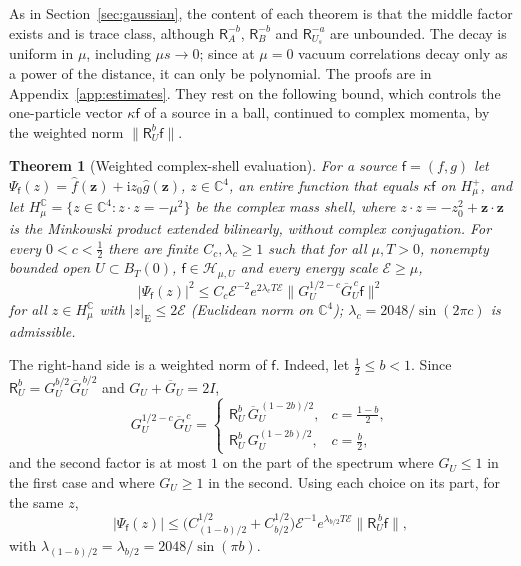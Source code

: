 \documentclass[aps,prl,reprint,longbibliography,raggedbottom]{revtex4-2}
\newtheorem{theorem}{Theorem}
\newcommand{\C}{\mathbb C}
\newcommand{\ii}{\mathrm i}
\newcommand{\norm}[1]{\lVert #1\rVert}
\newcommand{\abs}[1]{\lvert #1\rvert}
\newcommand{\Hh}{\mathcal H}
\newcommand{\Res}{\mathsf R}
\newcommand{\JointRes}{\Res_{U_s}}
\newcommand{\sx}{\mathsf f}
\newcommand{\bz}{\mathbf z}
\newcommand{\Energy}{\mathcal E}
\begin{document}
As in Section~\ref{sec:gaussian}, the content of each theorem is
that the middle factor exists and is trace class, although
$\Res_A^{-b}$, $\Res_B^{-b}$ and $\JointRes^{-a}$ are unbounded. The
decay is uniform in $\mu$, including $\mu s\to0$; since at $\mu=0$
vacuum correlations decay only as a power of the distance, it can only
be polynomial. The proofs are in Appendix~\ref{app:estimates}. They
rest on the following bound, which controls the one-particle vector
$\kappa\sx$ of a source in a ball, continued to complex momenta, by
the weighted norm $\norm{\Res_U^b\sx}$.

\begin{theorem}[Weighted complex-shell evaluation]\label{thm:evaluation}
For a source $\sx=(f,g)$ let $\Psi_\sx(z)=\hat f(\bz)+\ii z_0\hat g(\bz)$,
$z\in\C^4$, an entire function that equals $\kappa\sx$ on $H_\mu^+$,
and let $H_\mu^{\C}=\{z\in\C^4:z\cdot z=-\mu^2\}$ be the complex
mass shell, where $z\cdot z=-z_0^2+\bz\cdot\bz$ is the Minkowski product
extended bilinearly, without complex conjugation. For every $0<c<\frac12$ there are finite $C_c,\lambda_c\ge1$
such that for all $\mu,T>0$, nonempty bounded open $U\subset B_T(0)$,
$\sx\in\Hh_{\mu,U}$ and every energy scale $\Energy\ge\mu$,
\begin{equation}
\abs{\Psi_\sx(z)}^2\le C_c\Energy^{-2}e^{2\lambda_cT\Energy}
\norm{G_U^{1/2-c}\overline G_U^{\,c}\sx}^2
\label{eq:evaluation}
\end{equation}
for all $z\in H_\mu^{\C}$ with $\abs z_{\mathrm E}\le2\Energy$
(Euclidean norm on $\C^4$); $\lambda_c=2048/\sin(2\pi c)$ is admissible.
\end{theorem}

The right-hand side is a weighted norm of $\sx$. Indeed, let
$\frac12\le b<1$. Since $\Res_U^b=G_U^{b/2}\overline G_U^{\,b/2}$
and $G_U+\overline G_U=2I$,
\[
G_U^{1/2-c}\overline G_U^{\,c}=\begin{cases}
\Res_U^b\,\overline G_U^{\,(1-2b)/2},&c=\frac{1-b}2,\\[2pt]
\Res_U^b\,G_U^{(1-2b)/2},&c=\frac b2,
\end{cases}
\]
and the second factor is at most $1$ on the part of the spectrum
where $G_U\le1$ in the first case and where $G_U\ge1$ in the second.
Using each choice on its part, for the same $z$,
\begin{equation}
\abs{\Psi_\sx(z)}\le\bigl(C_{(1-b)/2}^{1/2}+C_{b/2}^{1/2}\bigr)
\Energy^{-1}e^{\lambda_{b/2}T\Energy}\norm{\Res_U^{\,b}\sx},
\label{eq:symmetric-evaluation}
\end{equation}
with $\lambda_{(1-b)/2}=\lambda_{b/2}=2048/\sin(\pi b)$.
\end{document}
